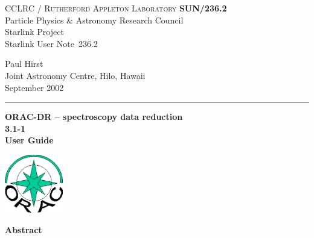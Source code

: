\documentclass[twoside,11pt]{article}
\newcommand{\stardoccategory}  {Starlink User Note}
\newcommand{\stardocinitials}  {SUN}
\newcommand{\stardocnumber}    {236.2}
\newcommand{\stardocauthors}   {Paul Hirst \\
                                Joint Astronomy Centre, Hilo, Hawaii}
\newcommand{\stardocdate}      {September 2002}
\newcommand{\stardoctitle}     {ORAC-DR -- spectroscopy data reduction}
\newcommand{\stardocversion}   {3.1-1}
\newcommand{\stardocmanual}    {User Guide}
\newcommand{\stardocname}{\stardocinitials /\stardocnumber}
\newenvironment{latexonly}{}{}
\renewcommand{\_}{\texttt{\symbol{95}}}
\begin{document}
\setcounter{secnumdepth}{5}
\thispagestyle{empty}

\begin{latexonly}
   CCLRC / \textsc{Rutherford Appleton Laboratory} \hfill \textbf{\stardocname}\\
   {\large Particle Physics \& Astronomy Research Council}\\
   {\large Starlink Project\\}
   {\large \stardoccategory\ \stardocnumber}
   \begin{flushright}
   \stardocauthors\\
   \stardocdate
   \end{flushright}
   \vspace{-4mm}
   \rule{\textwidth}{0.5mm}
   \vspace{5mm}
   \begin{center}
   {\Huge\textbf{\stardoctitle \\ [2.5ex]}}
   {\LARGE\textbf{\stardocversion \\ [4ex]}}
   {\Huge\textbf{\stardocmanual}}
   \end{center}
   \vspace{5mm}

\begin{center}
\includegraphics[width=1.0in]{sun236_logo.eps}
\end{center}

   \vspace{10mm}
   \begin{center}
      {\Large\textbf{Abstract}}
   \end{center}
\end{latexonly}
\end{document}
